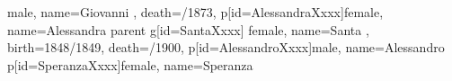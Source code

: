 \documentclass{article}
\begin{document}
\begin{midpage}
\begin{center}
\begin{genealogypicture}
{{{{{{{                            male,
                            name={Giovanni },
                            death={/1873}{},
                        }
                        p[id=AlessandraXxxx]{female, name={Alessandra }}
                    }
                    parent{
                        g[id=SantaXxxx]{
                            female,
                            name={Santa },
                            birth={1848/1849}{},
                            death={/1900}{},
                        }
                        p[id=AlessandroXxxx]{male, name={Alessandro }}
                        p[id=SperanzaXxxx]{female, name={Speranza }}
                    }
                }
            }
        }
    }
}
\end{genealogypicture}

\end{center}
\end{midpage}
\end{document}
